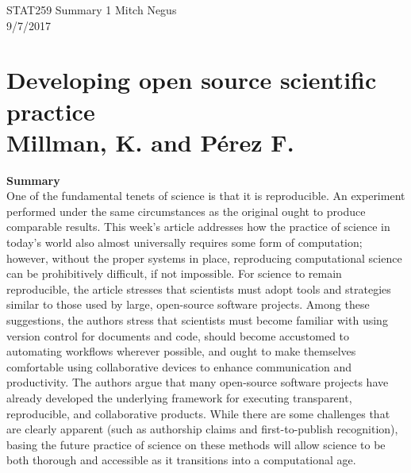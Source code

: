 \documentclass{report}
\newcommand{\tab}{\-\hspace{1cm}}
\begin{document}
\thispagestyle{empty}
\sffamily

\large {STAT259 Summary {1} \hfill Mitch Negus\\
		\hspace*{\fill} 9/7/2017\\ }
\section*{\textsf{Developing open source scientific practice \\ \normalsize Millman, K. and P\'erez F.}}

\textbf{Summary}\\
\tab One of the fundamental tenets of science is that it is reproducible. An experiment performed under the same circumstances as the original ought to produce comparable results. This week's article addresses how the practice of science in today's world also almost universally requires some form of computation; however, without the proper systems in place, reproducing computational science can be prohibitively difficult, if not impossible. For science to remain reproducible, the article stresses that scientists must adopt tools and strategies similar to those used by large, open-source software projects. Among these suggestions, the authors stress that scientists must become familiar with using version control for documents and code, should become accustomed to automating workflows wherever possible, and ought to make themselves comfortable using collaborative devices to enhance communication and productivity. The authors argue that many open-source software projects have already developed the underlying framework for executing transparent, reproducible, and collaborative products. While there are some challenges that are clearly apparent (such as authorship claims and first-to-publish recognition), basing the future practice of science on these methods will allow science to be both thorough and accessible as it transitions into a computational age.
\end{document}

